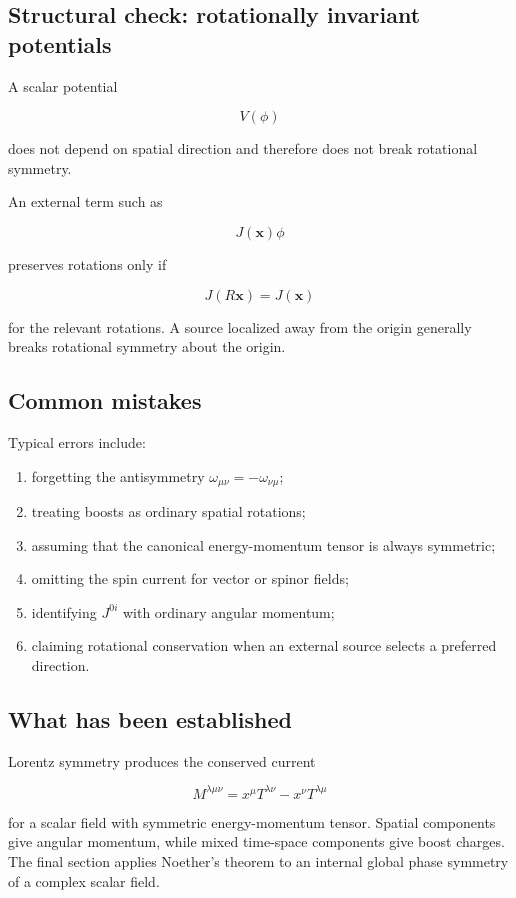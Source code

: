 \subsection{Structural check: rotationally invariant potentials}

A scalar potential

\[
V(\phi)
\]

does not depend on spatial direction and therefore does not break rotational symmetry.

An external term such as

\[
J(\mathbf{x})\phi
\]

preserves rotations only if

\[
J(R\mathbf{x})
=
J(\mathbf{x})
\]

for the relevant rotations. A source localized away from the origin generally breaks rotational symmetry about the origin.

\subsection{Common mistakes}

Typical errors include:

\begin{enumerate}
    \item forgetting the antisymmetry \(\omega_{\mu\nu}=-\omega_{\nu\mu}\);
    \item treating boosts as ordinary spatial rotations;
    \item assuming that the canonical energy-momentum tensor is always symmetric;
    \item omitting the spin current for vector or spinor fields;
    \item identifying \(J^{0i}\) with ordinary angular momentum;
    \item claiming rotational conservation when an external source selects a preferred direction.
\end{enumerate}

\subsection{What has been established}

Lorentz symmetry produces the conserved current

\[
M^{\lambda\mu\nu}
=
x^{\mu}T^{\lambda\nu}
-
x^{\nu}T^{\lambda\mu}
\]

for a scalar field with symmetric energy-momentum tensor. Spatial components give angular momentum, while mixed time-space components give boost charges. The final section applies Noether's theorem to an internal global phase symmetry of a complex scalar field.
